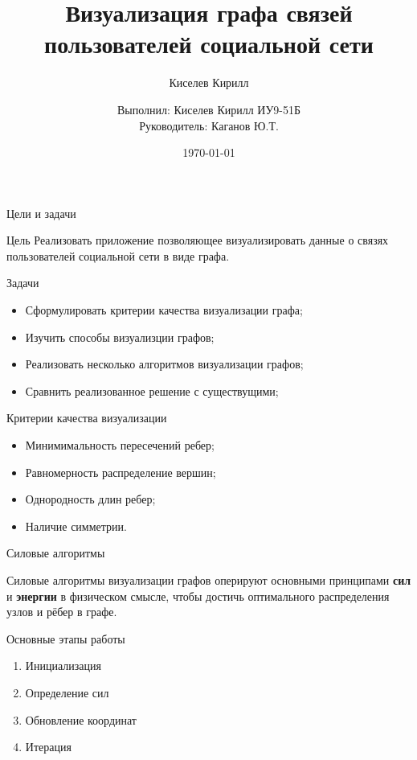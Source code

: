 \documentclass{beamer}
\title{Визуализация графа связей пользователей социальной сети}
\date{\today}
\author{Киселев Кирилл}
\author[me]{Выполнил: Киселев Кирилл ИУ9-51Б\\[1mm]Руководитель: Каганов Ю.Т.}
\begin{document}
\maketitle

\begin{frame}{Цели и задачи}
	\begin{alertblock}{Цель}
		Реализовать приложение позволяющее визуализировать данные о связях пользователей социальной сети в виде графа.
	\end{alertblock}
	\begin{alertblock}{Задачи}
    
		\begin{itemize}
			\item Сформулировать критерии качества визуализации графа;
			\item Изучить способы визуализции графов;
			\item Реализовать несколько алгоритмов визуализации графов;
			\item Сравнить реализованное решение с существущими;
		\end{itemize}
	\end{alertblock}
\end{frame}

\begin{frame}{Критерии качества визуализации}

	\begin{itemize}
		\item Минимимальность пересечений ребер;
		\item Равномерность распределение вершин;
		\item Однородность длин ребер;
		\item Наличие симметрии.
	\end{itemize}
\end{frame}

\begin{frame}{Силовые алгоритмы}

	\alert{Силовые алгоритмы} визуализации графов оперируют основными принципами \textbf{сил} и \textbf{энергии} в физическом смысле, чтобы достичь оптимального распределения узлов и рёбер в графе.

	\begin{alertblock}{Основные этапы работы}
		\begin{enumerate}
			\item Инициализация
			\item Определение сил
			\item Обновление координат
			\item Итерация
		\end{enumerate}
	\end{alertblock}



\end{frame}
\end{document}
